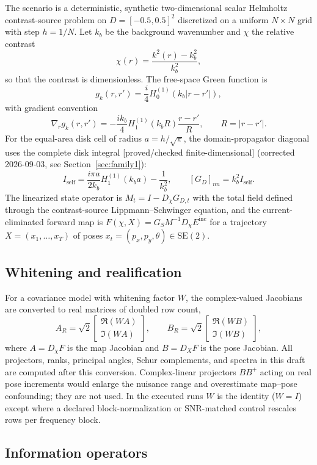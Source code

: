 \documentclass[12pt]{article}
\newcommand{\FDL}{\textnormal{[proved/checked finite-dimensional]}}
\begin{document}
The scenario is a deterministic, synthetic two-dimensional scalar Helmholtz
contrast-source problem on $D=[-0.5,0.5]^2$ discretized on a uniform $N\times
N$ grid with step $h=1/N$. Let $k_b$ be the background wavenumber and
$\chi$ the relative contrast
\[
\chi(r)=\frac{k^2(r)-k_b^2}{k_b^2},
\]
so that the contrast is dimensionless. The free-space Green function is
\[
g_k(r,r')=\frac{i}{4}H_0^{(1)}(k_b|r-r'|),
\]
with gradient convention
\[
\nabla_r g_k(r,r')=-\frac{i k_b}{4}H_1^{(1)}(k_b R)\frac{r-r'}{R},\qquad
R=|r-r'|.
\]
For the equal-area disk cell of radius $a=h/\sqrt{\pi}$, the domain-propagator
diagonal uses the complete disk integral \FDL{} (corrected 2026-09-03, see
Section~\ref{sec:family1}):
\[
I_{\mathrm{self}}=\frac{i\pi a}{2k_b}H_1^{(1)}(k_b a)-\frac{1}{k_b^2},\qquad
[G_D]_{nn}=k_b^2 I_{\mathrm{self}}.
\]
The linearized state operator is $M_t=I-D_\chi G_{D,t}$ with the total field
defined through the contrast-source Lippmann--Schwinger equation, and the
current-eliminated forward map is $F(\chi,X)=G_S M^{-1} D_\chi E^{\mathrm{inc}}$
for a trajectory $X=(x_1,\ldots,x_T)$ of poses $x_t=(p_x,p_y,\theta)\in
\mathrm{SE}(2)$.

\subsection{Whitening and realification}

For a covariance model with whitening factor $W$, the complex-valued Jacobians
are converted to real matrices of doubled row count,
\[
A_R=\sqrt{2}\begin{bmatrix}\Re(WA)\\\Im(WA)\end{bmatrix},\qquad
B_R=\sqrt{2}\begin{bmatrix}\Re(WB)\\\Im(WB)\end{bmatrix},
\]
where $A=D_\chi F$ is the map Jacobian and $B=D_X F$ is the pose Jacobian.
All projectors, ranks, principal angles, Schur complements, and spectra in
this draft are computed after this conversion. Complex-linear projectors
$BB^+$ acting on real pose increments would enlarge the nuisance range and
overestimate map--pose confounding; they are not used. In the executed runs
$W$ is the identity ($W=I$) except where a declared block-normalization or
SNR-matched control rescales rows per frequency block.

\subsection{Information operators}
\end{document}
